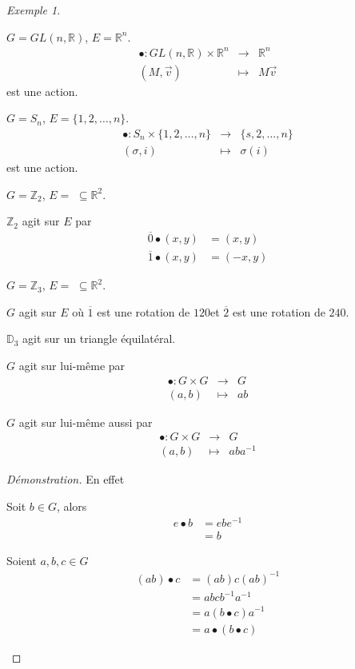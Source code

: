 \documentclass{report}
\newcommand*{\reels}{\mathbb{R}}
\newcommand*{\entiers}{\mathbb{Z}}
\theoremstyle{definition}
\theoremstyle{remark}
\newtheorem*{exem}{Exemple}
\newenvironment*{subproof}[1][D\'emonstration]
{
\begin{proof}[#1]

}
{
	\renewcommand{\qedsymbol}{$\blacksquare$}
\end{proof}
\renewcommand{\qedsymbol}{$\square$}
}
\begin{document}
	\begin{exem}~

		\begin{nlist}
			\item $G = GL(n, \reels)$, $E=\reels^n$.
			\[
			\begin{array}{rcl}
				\bullet:GL(n, \reels) \times \reels^n&\to&\reels^n\\
				(M, \vec{v})&\mapsto&M\vec{v}
			\end{array}
			\]
			est une action.
			\item $G = S_n$, $E = \{1,2,\dots,n\}$.
			\[
			\begin{array}{rcl}
				\bullet:S_n \times \{1,2,\dots,n\}&\to&\{s,2,\dots,n\}\\
				(\sigma,i)&\mapsto&\sigma(i)
			\end{array}
			\]
			est une action.
			\item $G = \entiers_2$, $E =$ {\LARGE\faChild} $\subseteq \reels^2$.

			$\entiers_2$ agit sur $E$ par
			\begin{align*}
				\overline0 \bullet (x,y)&= (x,y)\\
				\overline1 \bullet (x,y)&= (-x,y)
			\end{align*}
			\item $G = \entiers_3$, $E =$ {\LARGE\faRecycle} $\subseteq \reels^2$.

			$G$ agit sur $E$ o\`u $\overline1$ est une rotation de $120$\textdegree et $\overline2$ est une rotation de $240$\textdegree.
			\item $\mathbb{D}_3$ agit sur un triangle \'equilat\'eral.
			\item $G$ agit sur lui-m\^eme par
			\[
			\begin{array}{rcl}
				\bullet:G \times G&\to&G\\
				(a,b)&\mapsto&ab
			\end{array}
			\]
			\item $G$ agit sur lui-m\^eme aussi par
			\[
			\begin{array}{rcl}
				\bullet:G \times G&\to&G\\
				(a,b)&\mapsto&aba^{-1}
			\end{array}
			\]
			\begin{subproof}{En effet}~

				\begin{nlist}
					\item Soit $b \in G$, alors
					\begin{align*}
						e \bullet b&= ebe^{-1}\\
						&= b
					\end{align*}
					\item Soient $a,b,c \in G$
					\begin{align*}
						(ab) \bullet c&= (ab)c(ab)^{-1}\\
						&= abcb^{-1}a^{-1}\\
						&= a(b \bullet c)a^{-1}\\
						&= a \bullet (b \bullet c)
					\end{align*}
				\end{nlist}
			\end{subproof}
		\end{nlist}
	\end{exem}
\end{document}
